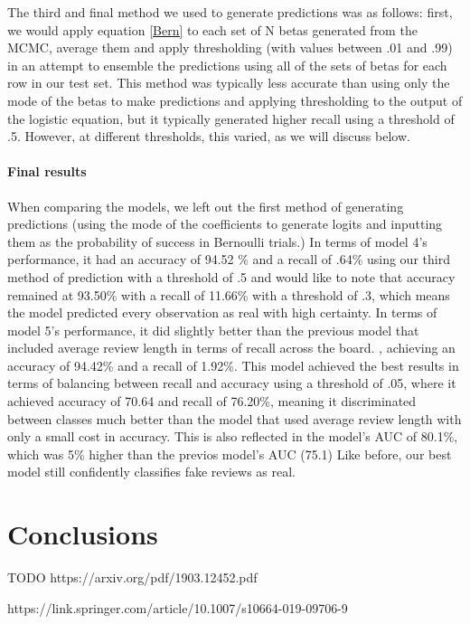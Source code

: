 \documentclass[man, floatsintext, 10pt]{apa6}
\begin{document}
The third and final method we used to generate predictions was as follows: first, we would apply equation \ref{Bern} to each set of N betas generated from the MCMC, average them and apply thresholding (with values between .01 and .99) in an attempt to ensemble the predictions using all of the sets of betas for each row in our test set. This method was typically less accurate than using only the mode of the betas to make predictions and applying thresholding to the output of the logistic equation, but it typically generated higher recall using a threshold of .5.  However, at different thresholds, this varied, as we will discuss below. 

\paragraph{Final results} When comparing the models, we left out the first method of generating predictions (using the mode of the coefficients to generate logits and inputting them as the probability of success in Bernoulli trials.)  In terms of model 4's performance, it  had an accuracy of 94.52 \% and a recall of .64\% using our third method of prediction with a threshold of .5 and would like to note that accuracy remained at 93.50\%  with a recall of 11.66\% with a threshold of .3, which means the model predicted every observation as real with high certainty. In terms of model 5's performance, it did slightly better than the previous model that included average review length in terms of recall across the board. , achieving an accuracy of 94.42\% and a recall of 1.92\%. This model achieved the best results in terms of balancing between recall and accuracy using a threshold of .05, where it achieved accuracy of  70.64\5 and recall of 76.20\%, meaning it discriminated between classes much better than the model that used average review length with only a small cost in accuracy.  This is also reflected in the model's AUC of 80.1\%, which was 5\% higher than the previos model's AUC (75.1) Like before, our best model still confidently classifies fake reviews as real.

\section{Conclusions} 

TODO https://arxiv.org/pdf/1903.12452.pdf

https://link.springer.com/article/10.1007/s10664-019-09706-9
\end{document}
